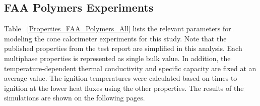 \clearpage

\subsection{FAA Polymers Experiments}\label{sec_FAA_Polymers_Materials}

Table ~\ref{Properties_FAA_Polymers_All} lists the relevant parameters for modeling the cone calorimeter experiments for this study.
Note that the published properties from the test report are simplified in this analysis. Each multiphase properties is represented as single bulk value. In addition, the temperature-dependent thermal conductivity and specific capacity are fixed at an average value.
The ignition temperatures were calculated based on times to ignition at the lower heat fluxes using the other properties.
The results of the simulations are shown on the following pages.

